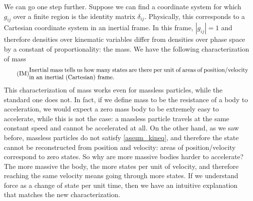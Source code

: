 We can go one step further. Suppose we can find a coordinate system for which $g_{ij}$ over a finite region is the identity matrix $\delta_{ij}$. Physically, this corresponds to a Cartesian coordinate system in an inertial frame. In this frame, $|g_{ij}| = 1$ and therefore densities over kinematic variables differ from densities over phase space by a constant of proportionality: the mass. We have the following characterization of mass
\begin{equation}
	\tag{IM}
	\parbox{5in}{Inertial mass tells us how many states are there per unit of areas of position/velocity in an inertial (Cartesian) frame.}
\end{equation}
This characterization of mass works even for massless particles, while the standard one does not. In fact, if we define mass to be the resistance of a body to acceleration, we would expect a zero mass body to be extremely easy to accelerate, while this is not the case: a massless particle travels at the same constant speed and cannot be accelerated at all. On the other hand, as we saw before, massless particles do not satisfy \ref{assum_kineq}, and therefore the state cannot be reconstructed from position and velocity: areas of position/velocity correspond to zero states. So why are more massive bodies harder to accelerate? The more massive the body, the more states per unit of velocity, and therefore reaching the same velocity means going through more states. If we understand force as a change of state per unit time, then we have an intuitive explanation that matches the new characterization.

